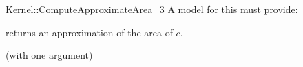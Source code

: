 \begin{ccRefFunctionObjectConcept}{Kernel::ComputeApproximateArea_3}
A model for this must provide:


       {returns an approximation of the area of $c$. }

\ccRefines
{} (with one argument)

\ccSeeAlso
{}\\

\end{ccRefFunctionObjectConcept}

